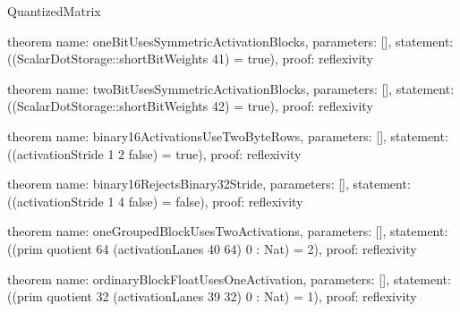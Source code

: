 \begin{lexlean}{QuantizedMatrix}
\begin{semanticmodule}
theorem{
  name: oneBitUsesSymmetricActivationBlocks,
  parameters: [],
  statement: ((ScalarDotStorage::shortBitWeights 41) = true),
  proof: reflexivity{}
}

theorem{
  name: twoBitUsesSymmetricActivationBlocks,
  parameters: [],
  statement: ((ScalarDotStorage::shortBitWeights 42) = true),
  proof: reflexivity{}
}

theorem{
  name: binary16ActivationsUseTwoByteRows,
  parameters: [],
  statement: ((activationStride 1 2 false) = true),
  proof: reflexivity{}
}

theorem{
  name: binary16RejectsBinary32Stride,
  parameters: [],
  statement: ((activationStride 1 4 false) = false),
  proof: reflexivity{}
}

theorem{
  name: oneGroupedBlockUsesTwoActivations,
  parameters: [],
  statement: ((prim quotient 64 (activationLanes 40 64) 0 : Nat) = 2),
  proof: reflexivity{}
}

theorem{
  name: ordinaryBlockFloatUsesOneActivation,
  parameters: [],
  statement: ((prim quotient 32 (activationLanes 39 32) 0 : Nat) = 1),
  proof: reflexivity{}
}
\end{semanticmodule}
\end{lexlean}
